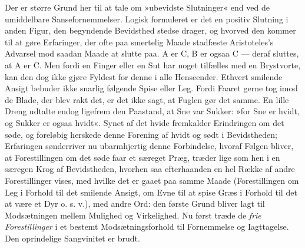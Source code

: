 \documentclass[12pt,a4paper,openany]{book}
\newcommand{\opage}[1]{\marginnote{\footnotesize\textit{[#1]}}}
\begin{document}
Der er større Grund her til at tale om »ubevidste Slutninger« end ved de
umiddelbare Sansefornemmelser. Logisk formuleret er det en positiv
Slutning i anden Figur, den begyndende Bevidsthed stedse drager, og
hvorved den kommer til at gøre Erfaringer, der ofte paa smertelig Maade
stadfæste Aristoteles’s Advarsel mod saadan Maade at slutte paa. A er C,
B er ogsaa C --- deraf sluttes, at A er C. Men fordi en Finger eller en
Sut har noget tilfælles med en Brystvorte, kan den dog ikke gjøre
Fyldest for denne i alle Henseender. Ethvert smilende Ansigt bebuder
ikke snarlig følgende Spise eller Leg. Fordi Faaret gerne tog imod de
Blade, der blev rakt
\opage{162}det, er det ikke sagt, at Fuglen gør det samme. En lille
Dreng udtalte endog ligefrem den Paastand, at Sne var Sukker: »for Sne
er hvidt, og Sukker er ogsaa hvidt«. Synet af det hvide fremkalder
Erindringen om det søde, og foreløbig herskede denne Forening af hvidt
og sødt i Bevidstheden; Erfaringen sønderriver nu ubarmhjertig denne
Forbindelse, hvoraf Følgen bliver, at Forestillingen om det søde faar et
særeget Præg, træder lige som hen i en særegen Krog af Bevidstheden,
hvorhen saa efterhaanden en hel Række af andre Forestillinger vises, med
hvilke det er gaaet paa samme Maade (Forestillingen om Leg i Forhold til
det smilende Ansigt, om Evne til at spise Græs i Forhold til det at være
et Dyr o. s. v.), med andre Ord: den første Grund bliver lagt til
Modsætningen mellem Mulighed og Virkelighed. Nu først træde de
\emph{frie Forestillinger} i et bestemt Modsætningsforhold til
Fornemmelse og Iagttagelse. Den oprindelige Sangvinitet er brudt.
\end{document}
